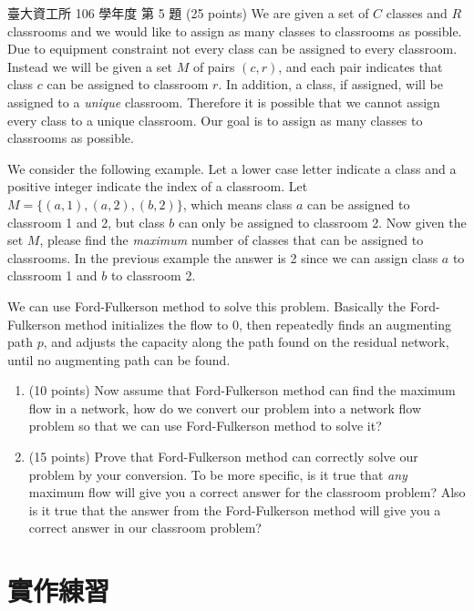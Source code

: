 \begin{pastexam}[label={px:flw-4}]{臺大資工所 106 學年度 第 5 題}
(25 points) We are given a set of $C$ classes and $R$ classrooms and we would like to assign as
many classes to classrooms as possible. Due to equipment constraint not every class can be
assigned to every classroom. Instead we will be given a set $M$ of pairs $(c,r)$, and each pair
indicates that class $c$ can be assigned to classroom $r$. In addition, a class, if assigned,
will be assigned to a \textit{unique} classroom. Therefore it is possible that we cannot assign
every class to a unique classroom. Our goal is to assign as many classes to classrooms as
possible.

We consider the following example. Let a lower case letter indicate a class and a positive
integer indicate the index of a classroom. Let $M=\{(a,1),(a,2),(b,2)\}$, which means class $a$
can be assigned to classroom 1 and 2, but class $b$ can only be assigned to classroom 2. Now
given the set $M$, please find the \textit{maximum} number of classes that can be assigned to
classrooms. In the previous example the answer is 2 since we can assign class $a$ to classroom
1 and $b$ to classroom 2.

We can use Ford-Fulkerson method to solve this problem. Basically the Ford-Fulkerson method
initializes the flow to 0, then repeatedly finds an augmenting path $p$, and adjusts the
capacity along the path found on the residual network, until no augmenting path can be found.
\begin{enumerate}[label=(\alph*)]
\item (10 points) Now assume that Ford-Fulkerson method can find the maximum flow in a network,
how do we convert our problem into a network flow problem so that we can use Ford-Fulkerson
method to solve it?
\item (15 points) Prove that Ford-Fulkerson method can correctly solve our problem by your
conversion. To be more specific, is it true that \textit{any} maximum flow will give you a
correct answer for the classroom problem? Also is it true that the answer from the
Ford-Fulkerson method will give you a correct answer in our classroom problem?
\end{enumerate}
\end{pastexam}

\section{實作練習}
\label{sec:flw-practice}

